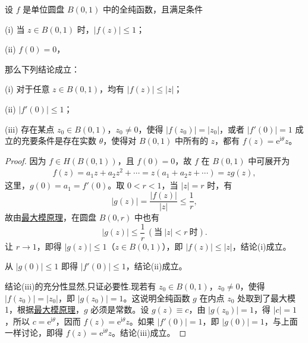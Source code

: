\documentclass[../../main.tex]{subfiles}%
\begin{document}
\begin{theorem}[Schwarz引理]\label{theorem:Schwarz引理-定理4.5.3}
设 \( f \) 是单位圆盘 \( B(0,1) \) 中的全纯函数，且满足条件

(i) 当 \( z \in B(0,1) \) 时，\( |f(z)| \leqslant  1 \)；

(ii) \( f(0) = 0 \)，

那么下列结论成立：

(i) 对于任意 \( z \in B(0,1) \)，均有 \( |f(z)| \leqslant  |z| \)；

(ii) \( |f'(0)| \leqslant  1 \)；

(iii) 存在某点 \( z_0 \in B(0,1) \)，\( z_0 \neq 0 \)，使得 \( |f(z_0)| = |z_0| \)，或者 \( |f'(0)| = 1 \) 成立的充要条件是存在实数 \( \theta \)，使得对 \( B(0,1) \) 中所有的 \( z \)，都有 \( f(z) = \mathrm{e}^{\mathrm{i}\theta} z \)。
\end{theorem}
\begin{proof}
因为 \( f \in H(B(0,1)) \)，且 \( f(0) = 0 \)，故 \( f \) 在 \( B(0,1) \) 中可展开为
\begin{align*}
f(z) = a_1 z + a_2 z^2 + \cdots = z(a_1 + a_2 z + \cdots) = z g(z),
\end{align*}
这里，\( g(0) = a_1 = f'(0) \)。取 \( 0 < r < 1 \)，当 \( |z| = r \) 时，有
\[
|g(z)| = \frac{|f(z)|}{|z|} \leqslant  \frac{1}{r},
\]
故由\hyperref[theorem:最大模原理-定理4.5.1]{最大模原理}，在圆盘 \( B(0,r) \) 中也有
\[
|g(z)| \leqslant  \frac{1}{r} \, (\text{当} \ |z| < r \ \text{时}).
\]
让 \( r \to 1 \)，即得 \( |g(z)| \leqslant  1 \)（\( z \in B(0,1) \)），即 \( |f(z)| \leqslant  |z| \)，结论(i)成立。

从 \( |g(0)| \leqslant  1 \) 即得 \( |f'(0)| \leqslant  1 \)，结论(ii)成立。

结论(iii)的充分性显然,只证必要性.现若有 \( z_0 \in B(0,1) \)，\( z_0 \neq 0 \)，使得 \( |f(z_0)| = |z_0| \)，即 \( |g(z_0)| = 1 \)。这说明全纯函数 \( g \) 在内点 \( z_0 \) 处取到了最大模 1，根据\hyperref[theorem:最大模原理-定理4.5.1]{最大模原理}，\( g \) 必须是常数。设 \( g(z) \equiv c \)，由 \( |g(z_0)| = 1 \)，得 \( |c| = 1 \)，所以 \( c = \mathrm{e}^{\mathrm{i}\theta} \)，因而 \( f(z) = \mathrm{e}^{\mathrm{i}\theta} z \)。如果 \( |f'(0)| = 1 \)，即 \( |g(0)| = 1 \)，与上面一样讨论，即得 \( f(z) = \mathrm{e}^{\mathrm{i}\theta} z \)。结论(iii)成立。
\end{proof}
\end{document}
